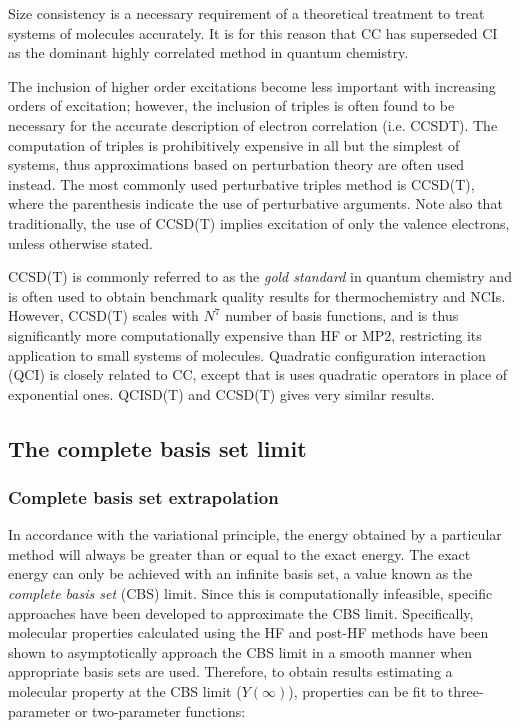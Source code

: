 \begin{doublespace}
\noindent Size consistency is a necessary requirement of a theoretical
treatment to treat systems of molecules accurately. It is for this reason that
CC has superseded CI as the dominant highly correlated method in quantum
chemistry.

The inclusion of higher order excitations become less important with increasing
orders of excitation; however, the inclusion of triples is often found to be
necessary for the accurate description of electron correlation (i.e. CCSDT). The
computation of triples is prohibitively expensive in all but the simplest of
systems, thus approximations based on perturbation theory are often used
instead. The most commonly used perturbative triples method is CCSD(T), where
the parenthesis indicate the use of perturbative arguments. Note also that
traditionally, the use of CCSD(T) implies excitation of only the valence
electrons, unless otherwise stated.

CCSD(T) is commonly referred to as the \emph{gold standard} in quantum chemistry
and is often used to obtain benchmark quality results for thermochemistry and
NCIs.\cite{Levine2013} However, CCSD(T) scales with $N^7$ number of basis
functions, and is thus significantly more computationally expensive than HF or
MP2, restricting its application to small systems of molecules. Quadratic
configuration interaction (QCI) is closely related to CC, except that is uses
quadratic operators in place of exponential ones. QCISD(T) and CCSD(T) gives
very similar results.\cite{Pople1987}

\subsection{The complete basis set limit}

\subsubsection{Complete basis set extrapolation}

In accordance with the variational principle, the energy obtained by a
particular method will always be greater than or equal to the exact energy. The
exact energy can only be achieved with an infinite basis set, a value known as
the \emph{complete basis set} (CBS) limit.\cite{Truhlar1998} Since this is
computationally infeasible, specific approaches have been developed to
approximate the CBS limit. Specifically, molecular properties calculated using
the HF and post-HF methods have been shown to asymptotically approach the CBS
limit in a smooth manner when appropriate basis sets are used. Therefore, to
obtain results estimating a molecular property at the CBS limit ($Y(\infty)$),
properties can be fit to three-parameter\cite{Feller1992,Feller1993} or
two-parameter functions:\cite{Helgaker1997,Halkier1998}


\end{doublespace}

